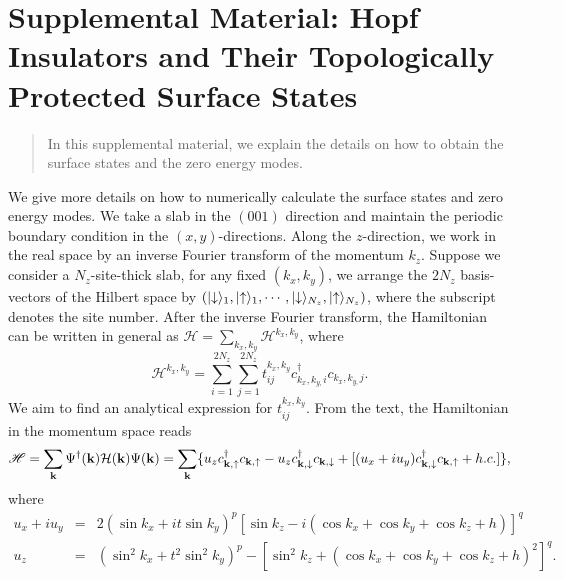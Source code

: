 \documentclass[twocolumn,prb,aps,epsfig,superscriptaddress,showpacs]{revtex4-1}
\begin{document}
\onecolumngrid
\appendix
\clearpage
\section*{Supplemental Material: Hopf Insulators and Their Topologically
Protected Surface States}
\begin{quote}
In this supplemental material, we explain the details on how to obtain
the surface states and the zero energy modes.
\end{quote}

We give more details on how to numerically calculate the surface states and
zero energy modes. We take a slab in the $(001)$ direction and maintain the
periodic boundary condition in the $\left( x,y\right) $-directions. Along
the $z$-direction, we work in the real space by an inverse Fourier transform of
the momentum $k_{z}$. Suppose we consider a $N_{z}$-site-thick slab, for any
fixed $(k_{x},k_{y})$, we arrange the $2N_{z}$ basis-vectors of the Hilbert
space by $(|\hspace{-0.1cm}\downarrow \rangle _{1},|\hspace{-0.1cm}\uparrow
\rangle _{1},\cdots ,|\hspace{-0.1cm}\downarrow \rangle _{N_{z}},|\hspace{%
-0.1cm}\uparrow \rangle _{N_{z}})$, where the subscript denotes the site
number. After the inverse Fourier transform, the Hamiltonian can be written
in general as $\mathscr{H}=\sum_{k_{x},k_{y}}\mathcal{H}^{k_{x},k_{y}}$,
where
\begin{equation}
\mathcal{H}^{k_{x},k_{y}}=\sum_{i=1}^{2N_{z}}%
\sum_{j=1}^{2N_{z}}t_{ij}^{k_{x},k_{y}}c_{k_{x},k_{y,}i}^{\dagger
}c_{k_{x},k_{y,}j}.  \label{eq:Hkxky}
\end{equation}%
We aim to find an analytical expression for $t_{ij}^{k_{x},k_{y}}$. From the
text, the Hamiltonian in the momentum space reads 
\begin{equation}
\mathscr{H}=\sum_{\mathbf{k}}\Psi ^{\dagger }(\mathbf{k})\mathcal{H}(\mathbf{%
k})\Psi (\mathbf{k})=\sum_{\mathbf{k}}\{u_{z}c_{\mathbf{k},\uparrow
}^{\dagger }c_{\mathbf{k},\uparrow }-u_{z}c_{\mathbf{k},\downarrow
}^{\dagger }c_{\mathbf{k},\downarrow }+[(u_{x}+iu_{y})c_{\mathbf{k},\downarrow
}^{\dagger }c_{\mathbf{k},\uparrow }+h.c.]\},
\end{equation}%
where 
\begin{eqnarray}
u_{x}+iu_{y} &=&2(\sin k_{x}+it\sin k_{y})^{p}[\sin k_{z}-i(\cos k_{x}+\cos
k_{y}+\cos k_{z}+h)]^{q}  \label{eq:uxuy} \\
u_{z} &=&(\sin ^{2}k_{x}+t^{2}\sin ^{2}k_{y})^{p}-[\sin ^{2}k_{z}+(\cos
k_{x}+\cos k_{y}+\cos k_{z}+h)^{2}]^{q}.  \label{eq:uz}
\end{eqnarray}%
\end{document}
